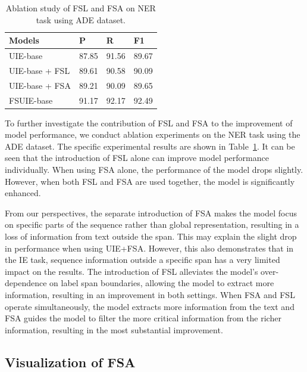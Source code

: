 \documentclass[11pt]{article}
\begin{document}
\begin{table}[!ht]
    \centering
    \small
    \begin{tabular}{llll}
        \toprule
        \textbf{Models} & \textbf{P} & \textbf{R} & \textbf{F1 } \\ 
        \midrule
        UIE-base & 87.85 & 91.56 & 89.67  \\ 
        UIE-base + FSL & 89.61 & 90.58 & 90.09  \\ 
        UIE-base + FSA & 89.21 & 90.09 & 89.65  \\ 
        FSUIE-base & 91.17 & 92.17 & 92.49  \\ 
        \bottomrule
    \end{tabular}
    \caption{Ablation study of FSL and FSA on NER task using ADE dataset.}\label{tab:ablation_results}
\end{table}



To further investigate the contribution of FSL and FSA to the improvement of model performance, we conduct ablation experiments on the NER task using the ADE dataset. The specific experimental results are shown in Table~\ref{tab:ablation_results}. It can be seen that the introduction of FSL alone can improve model performance individually. When using FSA alone, the performance of the model drops slightly. However, when both FSL and FSA are used together, the model is significantly enhanced.

From our perspectives, the separate introduction of FSA makes the model focus on specific parts of the sequence rather than global representation, resulting in a loss of information from text outside the span. This may explain the slight drop in performance when using UIE+FSA. However, this also demonstrates that in the IE task, sequence information outside a specific span has a very limited impact on the results. The introduction of FSL alleviates the model's over-dependence on label span boundaries, allowing the model to extract more information, resulting in an improvement in both settings. When FSA and FSL operate simultaneously, the model extracts more information from the text and FSA guides the model to filter the more critical information from the richer information, resulting in the most substantial improvement.


\subsection{Visualization of FSA}
\end{document}
